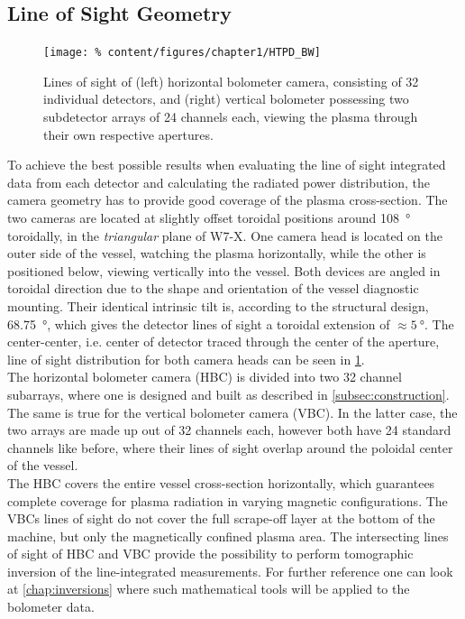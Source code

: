         \subsection{Line of Sight Geometry}\label{subsec:losgeometry}
%
            \begin{figure}[t]%
                \centering%
                \texttt{[image: \%
                    content/figures/chapter1/HTPD\_BW]}%
                \caption{Lines of sight of (left) horizontal bolometer camera, consisting of 32 individual detectors, and (right) vertical bolometer possessing two subdetector arrays of 24 channels each, viewing the plasma through their own respective apertures.}\label{fig:los_vessel}%
            \end{figure}%
%
            To achieve the best possible results when evaluating the line of sight integrated data from each detector and calculating the radiated power distribution, the camera geometry has to provide good coverage of the plasma cross-section. The two cameras are located at slightly offset toroidal positions around \SI{108}{\degree} toroidally, in the \textit{triangular} plane of W7-X. One camera head is located on the outer side of the vessel, watching the plasma horizontally, while the other is positioned below, viewing vertically into the vessel. Both devices are angled in toroidal direction due to the shape and orientation of the vessel diagnostic mounting. Their identical intrinsic tilt is, according to the structural design, \SI{68.75}{\degree}, which gives the detector lines of sight a toroidal extension of $\approx\SI{5}{\degree}$. The center-center, i.e. center of detector traced through the center of the aperture, line of sight distribution for both camera heads can be seen in \cref{fig:los_vessel}.\\%
            The horizontal bolometer camera (HBC) is divided into two 32 channel subarrays, where one is designed and built as described in \cref{subsec:construction}. The same is true for the vertical bolometer camera (VBC). In the latter case, the two arrays are made up out of 32 channels each, however both have 24 standard channels like before, where their lines of sight overlap around the poloidal center of the vessel.\\%
            The HBC covers the entire vessel cross-section horizontally, which guarantees complete coverage for plasma radiation in varying magnetic configurations. The VBCs lines of sight do not cover the full scrape-off layer at the bottom of the machine, but only the magnetically confined plasma area. The intersecting lines of sight of HBC and VBC provide the possibility to perform tomographic inversion of the line-integrated measurements. For further reference one can look at \cref{chap:inversions} where such mathematical tools will be applied to the bolometer data.\\%
